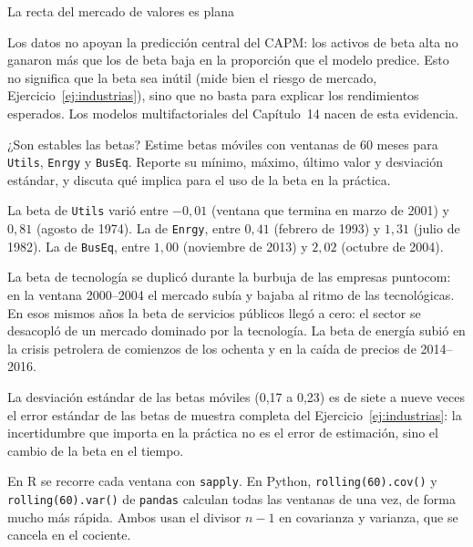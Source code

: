 \begin{ejresuelto}{La recta del mercado de valores es plana}
\begin{conclusion}
Los datos no apoyan la predicción central del CAPM: los activos de beta alta no ganaron más que los de beta
baja en la proporción que el modelo predice. Esto no significa que la beta sea inútil (mide bien el riesgo
de mercado, Ejercicio~\ref{ej:industrias}), sino que no basta para explicar los rendimientos esperados. Los
modelos multifactoriales del Capítulo~14 nacen de esta evidencia.
\end{conclusion}
\end{ejresuelto}

\begin{ejresuelto}{¿Son estables las betas?}\label{ej:movil}
\enunciado Estime betas móviles con ventanas de 60 meses para \texttt{Utils}, \texttt{Enrgy} y
\texttt{BusEq}. Reporte su mínimo, máximo, último valor y desviación estándar, y discuta qué implica para
el uso de la beta en la práctica.

\solucion
{} La beta de \texttt{Utils} varió entre $-0{,}01$ (ventana que termina en marzo de
2001) y $0{,}81$ (agosto de 1974). La de \texttt{Enrgy}, entre $0{,}41$ (febrero de 1993) y $1{,}31$
(julio de 1982). La de \texttt{BusEq}, entre $1{,}00$ (noviembre de 2013) y $2{,}02$ (octubre de 2004).

 La beta de tecnología se duplicó durante la burbuja de las empresas
puntocom: en la ventana 2000--2004 el mercado subía y bajaba al ritmo de las tecnológicas. En esos mismos
años la beta de servicios públicos llegó a cero: el sector se desacopló de un mercado dominado por la
tecnología. La beta de energía subió en la crisis petrolera de comienzos de los ochenta y en la caída de
precios de 2014--2016.

 La desviación estándar de las betas móviles (0,17 a 0,23) es de siete a nueve veces el
error estándar de las betas de muestra completa del Ejercicio~\ref{ej:industrias}: la incertidumbre que importa
en la práctica no es el error de estimación, sino el cambio de la beta en el tiempo.


\RvsPy En R se recorre cada ventana con \texttt{sapply}. En Python, \texttt{rolling(60).cov()} y
\texttt{rolling(60).var()} de \texttt{pandas} calculan todas las ventanas de una vez, de forma mucho más
rápida. Ambos usan el divisor $n-1$ en covarianza y varianza, que se cancela en el cociente.


\end{ejresuelto}
